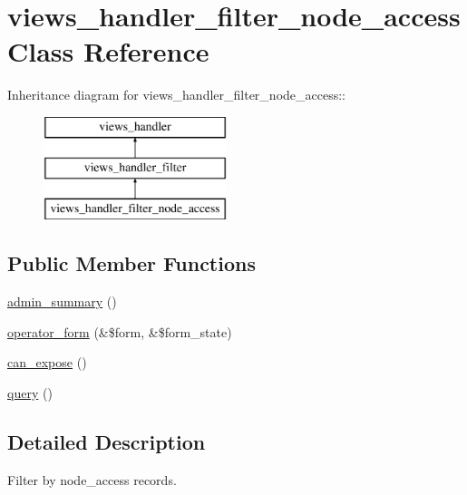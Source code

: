 \hypertarget{classviews__handler__filter__node__access}{
\section{views\_\-handler\_\-filter\_\-node\_\-access Class Reference}
\label{classviews__handler__filter__node__access}
}
Inheritance diagram for views\_\-handler\_\-filter\_\-node\_\-access::\begin{figure}[H]
\begin{center}
\leavevmode
\includegraphics[height=3cm]{classviews__handler__filter__node__access}
\end{center}
\end{figure}
\subsection*{Public Member Functions}
\begin{DoxyCompactItemize}
\item 
\hyperlink{classviews__handler__filter__node__access_a2f3abe4aa9418904e52937d1549fd560}{admin\_\-summary} ()
\item 
\hyperlink{classviews__handler__filter__node__access_af1cb315c0afc295fa7ded78ee47401c8}{operator\_\-form} (\&\$form, \&\$form\_\-state)
\item 
\hyperlink{classviews__handler__filter__node__access_a20eacba1b9be3c0e6b8245191b60a9ff}{can\_\-expose} ()
\item 
\hyperlink{classviews__handler__filter__node__access_ab7f054a6a94abf2f41ce70fd40cf2e5e}{query} ()
\end{DoxyCompactItemize}


\subsection{Detailed Description}
Filter by node\_\-access records. 

